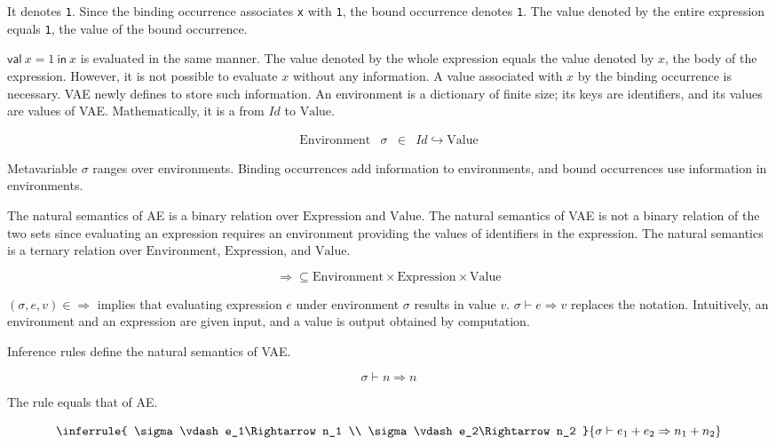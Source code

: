It denotes \verb!1!. Since the binding occurrence associates \verb!x! with
\verb!1!, the bound occurrence denotes \verb!1!. The value denoted by the entire
expression equals \verb!1!, the value of the bound occurrence.

\(\textsf{val}\ x=1\ \textsf{in}\ x\) is evaluated in the same manner. The value
denoted by the whole expression equals the value denoted by \(x\), the body of
the expression. However, it is not possible to evaluate \(x\) without any
information. A value associated with \(x\) by the binding occurrence is
necessary. VAE newly defines  to store such information. An
environment is a dictionary of finite size; its keys are identifiers, and its
values are values of VAE. Mathematically, it is a  from
\(\mathit{Id}\) to \(\text{Value}\).

\[
\begin{array}{lrcl}
\text{Environment} & \sigma & \in & \mathit{Id}\hookrightarrow \text{Value}
\end{array}
\]

Metavariable \(\sigma\) ranges over environments. Binding occurrences add
information to environments, and bound occurrences use information in
environments.

The natural semantics of AE is a binary relation over \(\text{Expression}\) and
\(\text{Value}\). The natural semantics of VAE is not a binary relation of the
two sets since evaluating an expression requires an environment providing the
values of identifiers in the expression. The natural semantics is a ternary
relation over \(\text{Environment}\), \(\text{Expression}\), and
\(\text{Value}\).


\[\Rightarrow\subseteq\text{Environment}\times\text{Expression}\times\text{Value}\]

\((\sigma,e,v)\in\Rightarrow\) implies that evaluating expression \(e\) under
environment \(\sigma\) results in value \(v\). \(\sigma\vdash e\Rightarrow v\)
replaces the notation. Intuitively, an environment and an expression are given
input, and a value is output obtained by computation.

Inference rules define the natural semantics of VAE.

\[
\sigma\vdash n\Rightarrow n
\]

The rule equals that of AE.

\[
\inferrule
{ \sigma\vdash e_1\Rightarrow n_1 \\ \sigma\vdash e_2\Rightarrow n_2 }
{ \sigma\vdash e_1+e_2\Rightarrow n_1+n_2 }
\]

